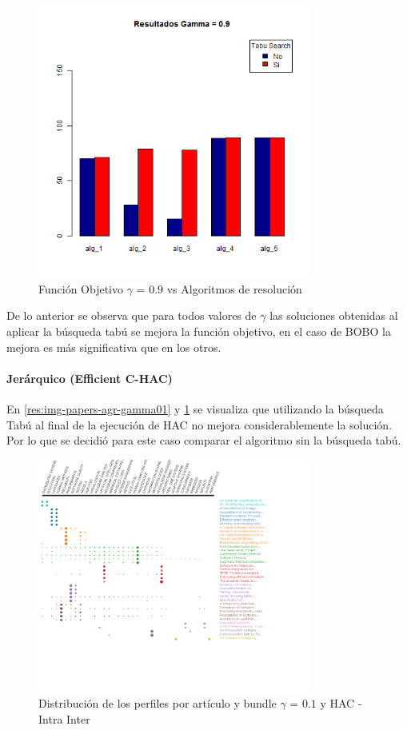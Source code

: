 \begin{figure}[H]
  \centering
    \includegraphics[width=0.8\textwidth]{resultados/papers/Graficos_agrupados/gamma09.png}
  \caption{Función Objetivo $\gamma$ = $0.9$ vs Algoritmos de resolución}
  \label{res:img-papers-agr-gamma09}
\end{figure}

De lo anterior se observa que para todos valores de $\gamma$ las soluciones obtenidas al aplicar la búsqueda tabú se mejora la función objetivo, en el caso de BOBO la mejora es más significativa que en los otros.\\

\paragraph{Jerárquico (Efficient C-HAC)}
En \ref{res:img-papers-agr-gamma01} y \ref{res:img-papers-agr-gamma09} se visualiza que utilizando la búsqueda Tabú al final de la ejecución de HAC no mejora considerablemente la solución. Por lo que se decidió para este caso comparar el algoritmo sin la búsqueda tabú.
\begin{figure}[H]
  \centering
    \includegraphics[width=0.8\textwidth]{resultados/papers/HAC/INTRA_INTER/gamma-01.png}
  \caption{Distribución de los perfiles por artículo y bundle $\gamma$ = $0.1$ y HAC - Intra Inter}
  \label{res:img-papers-gamma01-hac-intra-inter}
\end{figure}

